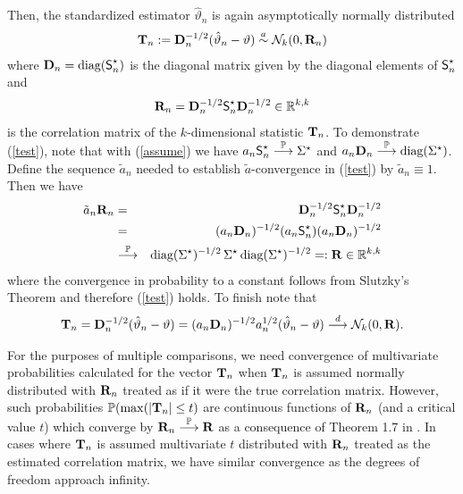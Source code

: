 \documentclass[bimj,fleqn]{w-art}
\begin{document}
Then, the standardized estimator $\hat{\vartheta}_n$ is again asymptotically normally
distributed
\begin{eqnarray} \label{test}
\T_n := %
\D_n^{-1/2} (\hat{\vartheta}_n - \vartheta) \an \N_k(0, \Cor_n)
\end{eqnarray}
where $\mathbf{D}_n = \text{diag}(\textsf{S}^\star_n)$ is the diagonal matrix given by the diagonal elements of
$\textsf{S}^\star_n$ and 
\begin{eqnarray*}
\mathbf{R}_n = \mathbf{D}_n^{-1/2} \textsf{S}^\star_n \mathbf{D}_n^{-1/2} \in \mathbb{R}^{k,k} 
\end{eqnarray*}
is the correlation matrix of the $k$-dimensional statistic 
$\mathbf{T}_n$. 
To demonstrate (\ref{test}), note that 
with (\ref{assume}) we have $a_n \textsf{S}^\star_n \stackrel{\mathbb{P}}{\longrightarrow} \Sigma^\star$ 
and $a_n \mathbf{D}_n \stackrel{\mathbb{P}}{\longrightarrow} \text{diag}(\Sigma^\star)$. 
Define the sequence $\tilde{a}_n$ needed to
establish $\tilde{a}$-convergence in (\ref{test}) by $\tilde{a}_n \equiv
1$. Then we have
\begin{eqnarray*}
\tilde{a}_n \mathbf{R}_n  & = & \mathbf{D}_n^{-1/2} \textsf{S}^\star_n \mathbf{D}_n^{-1/2} \\
& = & (a_n \mathbf{D}_n)^{-1/2} (a_n \textsf{S}^\star_n) (a_n \mathbf{D}_n)^{-1/2} \\
& \stackrel{\mathbb{P}}{\longrightarrow} & \text{diag}(\Sigma^\star)^{-1/2} \, \Sigma^\star \, \text{diag}(\Sigma^\star)^{-1/2} 
=: \mathbf{R} \in \mathbb{R}^{k,k}
\end{eqnarray*}
where the convergence in probability to a constant follows from
Slutzky's Theorem \citep[Theorem 1.5.4,][]{Serfling1980} and 
therefore (\ref{test}) holds. To finish note that
\begin{eqnarray*}
\mathbf{T}_n = \mathbf{D}_n^{-1/2} (\hat{\vartheta}_n - \vartheta) = (a_n \mathbf{D}_n)^{-1/2}
a_n^{1/2} (\hat{\vartheta}_n - \vartheta) \stackrel{d}{\longrightarrow} \mathcal{N}_k(0, \mathbf{R}).
\end{eqnarray*}


For the purposes of multiple comparisons, we need convergence of
multivariate probabilities calculated for the vector $\mathbf{T}_n$ when $\mathbf{T}_n$ is
assumed normally distributed with $\mathbf{R}_n$ treated as if it were the true
correlation matrix.
However, such probabilities $\mathbb{P}(\max(|\mathbf{T}_n| \le t)$
are continuous functions of $\mathbf{R}_n$ (and a critical value $t$) which converge by
$\mathbf{R}_n \stackrel{\mathbb{P}}{\longrightarrow} \mathbf{R}$ as a consequence of Theorem 1.7 in \cite{Serfling1980}.
In cases where $\mathbf{T}_n$ is assumed
multivariate $t$ distributed with $\mathbf{R}_n$ treated as the estimated correlation
matrix, we have similar convergence as the degrees of freedom approach
infinity.
\end{document}
